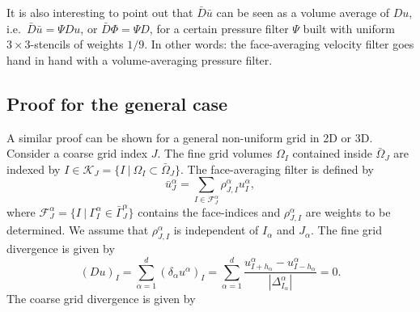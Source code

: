 \documentclass[preprint]{elsarticle}
\begin{document}
It is also interesting to point out that $\bar{D} \bar{u}$ can be seen as a
volume average of $D u$, i.e.\ $\bar{D} \bar{u} = \Psi D u$, or $\bar{D} \Phi =
\Psi D$, for a certain pressure filter $\Psi$ built with uniform $3 \times
3$-stencils of weights $1 / 9$. In other words: the face-averaging velocity
filter goes hand in hand with a volume-averaging pressure filter.

\subsection{Proof for the general case}

A similar proof can be shown for a general non-uniform grid in 2D or 3D.
Consider a coarse grid index $J$. The fine grid volumes $\Omega_I$ contained
inside $\bar{\Omega}_J$ are indexed by $I \in \mathcal{K}_J = \{ I \ | \
\Omega_I \subset \bar{\Omega}_J\}$. The face-averaging filter is defined by
\begin{equation}
    \bar{u}^\alpha_J = \sum_{I \in \mathcal{F}^\alpha_J} \rho^\alpha_{J, I}
    u^\alpha_I,
\end{equation}
where $\mathcal{F}^\alpha_J = \{I \ | \ \Gamma^\alpha_I \in
\bar{\Gamma}^\alpha_J \}$ contains the face-indices and $\rho^\alpha_{J, I}$ are
weights to be determined. We assume that $\rho^\alpha_{J, I}$ is independent of
$I_\alpha$ and $J_\alpha$. The fine grid divergence is given by
\begin{equation}
    (D u)_I =
    \sum_{\alpha = 1}^d (\delta_\alpha u^\alpha)_I = 
    \sum_{\alpha = 1}^d \frac{u^\alpha_{I + h_\alpha} - u^\alpha_{I -
    h_\alpha}}{| \Delta^\alpha_{I_\alpha} |}
    = 0.
\end{equation}
The coarse grid divergence is given by
\end{document}
